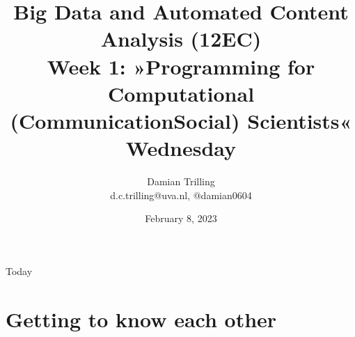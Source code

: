 

\graphicspath{{../../resources/img/}}




\title[Big Data and Automated Content Analysis]{\textbf{Big Data and Automated Content Analysis (12EC)} 
\\Week 1: »Programming for Computational (Communication\textbar Social) Scientists«
\\Wednesday }
\author[Damian Trilling]{Damian Trilling\\ \footnotesize{d.c.trilling@uva.nl, @damian0604 \\}}
\date{February 8, 2023}


\begin{frame}{}
	\titlepage
\end{frame}

\begin{frame}{Today}
	\tableofcontents
\end{frame}




\section{Getting to know each other}

